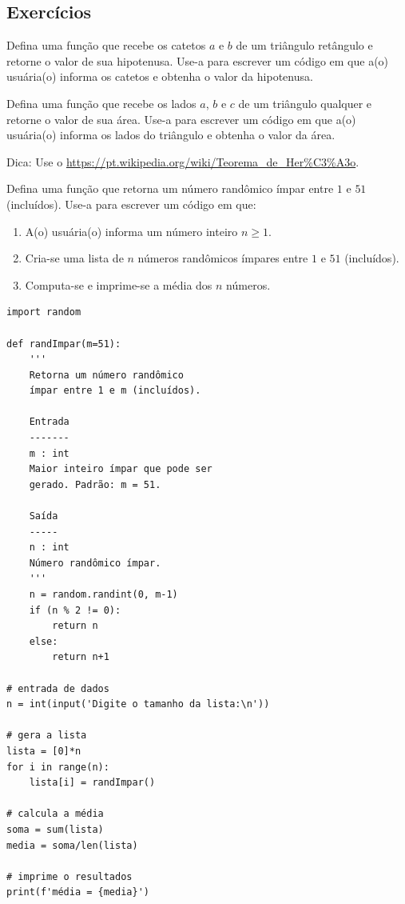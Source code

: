 \subsection{Exercícios}

\begin{exer}
  Defina uma função que recebe os catetos $a$ e $b$ de um triângulo retângulo e retorne o valor de sua hipotenusa. Use-a para escrever um código em que a(o) usuária(o) informa os catetos e obtenha o valor da hipotenusa.
\end{exer}

\begin{exer}
  Defina uma função que recebe os lados $a$, $b$ e $c$ de um triângulo qualquer e retorne o valor de sua área. Use-a para escrever um código em que a(o) usuária(o) informa os lados do triângulo e obtenha o valor da área.  
\end{exer}
\begin{resp}
  Dica: Use o \href{Teorema de Heron}{https://pt.wikipedia.org/wiki/Teorema\_de\_Her\%C3\%A3o}.
\end{resp}

\begin{exer}
  Defina uma função que retorna um número randômico ímpar entre $1$ e $51$ (incluídos). Use-a para escrever um código em que:
  \begin{enumerate}[1.]
  \item A(o) usuária(o) informa um número inteiro $n\geq 1$.
  \item Cria-se uma lista de $n$ números randômicos ímpares entre $1$ e $51$ (incluídos).
  \item Computa-se e imprime-se a média dos $n$ números.
  \end{enumerate}
\end{exer}
\begin{resp}

\begin{lstlisting}
import random

def randImpar(m=51):
    '''
    Retorna um número randômico
    ímpar entre 1 e m (incluídos).

    Entrada
    -------
    m : int
    Maior inteiro ímpar que pode ser 
    gerado. Padrão: m = 51.

    Saída
    -----
    n : int
    Número randômico ímpar.
    '''
    n = random.randint(0, m-1)
    if (n % 2 != 0):
        return n
    else:
        return n+1

# entrada de dados
n = int(input('Digite o tamanho da lista:\n'))

# gera a lista
lista = [0]*n
for i in range(n):
    lista[i] = randImpar()

# calcula a média
soma = sum(lista)
media = soma/len(lista)

# imprime o resultados
print(f'média = {media}')
\end{lstlisting}

\end{resp}

